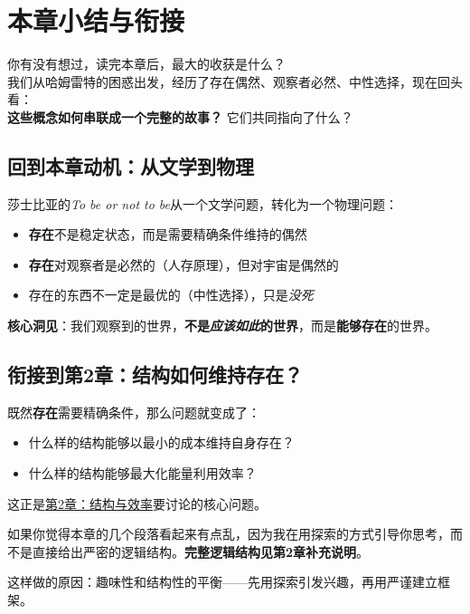 \documentclass[openany, a4paper, 12pt]{book}
\begin{document}
	\section{本章小结与衔接}

	\begin{readingnote}
		你有没有想过，读完本章后，最大的收获是什么？\\
		我们从哈姆雷特的困惑出发，经历了存在偶然、观察者必然、中性选择，现在回头看：\\
		\textbf{这些概念如何串联成一个完整的故事？} 它们共同指向了什么？
	\end{readingnote}

	\subsection{回到本章动机：从文学到物理}

	莎士比亚的\textit{To be or not to be}从一个文学问题，转化为一个物理问题：

	\begin{itemize}
		\item \textbf{存在}不是稳定状态，而是需要精确条件维持的偶然
		\item \textbf{存在}对观察者是必然的（人存原理），但对宇宙是偶然的
		\item 存在的东西不一定是最优的（中性选择），只是\textit{没死}
	\end{itemize}

	\textbf{\huge 核心洞见}：我们观察到的世界，\textbf{不是\textit{应该如此}的世界}，而是\textbf{能够存在}的世界。

	\subsection{衔接到第2章：结构如何维持存在？}

	既然\textbf{存在}需要精确条件，那么问题就变成了：

	\begin{itemize}
		\item 什么样的结构能够以最小的成本维持自身存在？
		\item 什么样的结构能够最大化能量利用效率？
	\end{itemize}

	这正是\hyperref[ch:structure]{第2章：结构与效率}要讨论的核心问题。

	\begin{tcolorbox}[colback=blue!5, title=\textit{读者可能的问题}]
		如果你觉得本章的几个段落看起来有点乱，因为我在用探索的方式引导你思考，而不是直接给出严密的逻辑结构。\textbf{完整逻辑结构见第2章补充说明}。

		这样做的原因：趣味性和结构性的平衡——先用探索引发兴趣，再用严谨建立框架。
	\end{tcolorbox}
\end{document}
